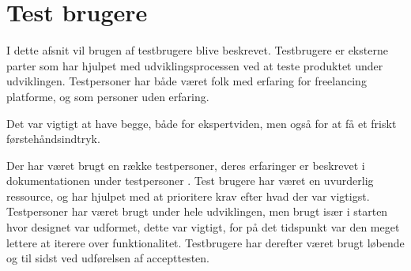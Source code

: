 \chapter{Test brugere}

I dette afsnit vil brugen af testbrugere blive beskrevet. Testbrugere er eksterne parter som har hjulpet med udviklingsprocessen ved at teste produktet under udviklingen. Testpersoner har både været folk med erfaring for freelancing platforme, og som personer uden erfaring.

Det var vigtigt at have begge, både for ekspertviden, men også for at få et friskt førstehåndsindtryk.

Der har været brugt en række testpersoner, deres erfaringer er beskrevet i dokumentationen under testpersoner \cite{test-users}. Test brugere har været en uvurderlig ressource, og har hjulpet med at prioritere krav efter hvad der var vigtigst. Testpersoner har været brugt under hele udviklingen, men brugt især i starten hvor designet var udformet, dette var vigtigt, for på det tidspunkt var den meget lettere at iterere over funktionalitet. Testbrugere har derefter været brugt løbende og til sidst ved udførelsen af accepttesten.